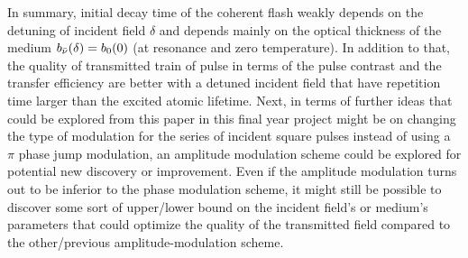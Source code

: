 In summary, initial decay time of the coherent flash weakly depends on the detuning of incident field $\delta$ and depends mainly on the optical thickness of the medium $b_{\Bar{\nu}}(\delta) = b_{0}(0)$ (at resonance and zero temperature). In addition to that, the quality of transmitted train of pulse in terms of the pulse contrast and the transfer efficiency are better with a detuned incident field that have repetition time larger than the excited atomic lifetime. Next, in terms of further ideas that could be explored from this paper in this final year project might be on changing the type of modulation for the series of incident square pulses instead of using a $\pi$ phase jump modulation, an amplitude modulation scheme could be explored for potential new discovery or improvement. Even if the amplitude modulation turns out to be inferior to the phase modulation scheme, it might still be possible to discover some sort of upper/lower bound on the incident field's or medium's parameters that could optimize the quality of the transmitted field compared to the other/previous amplitude-modulation scheme.
